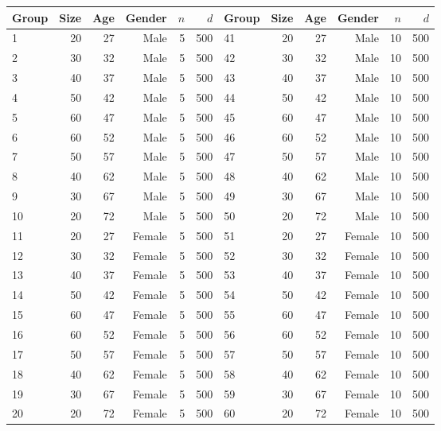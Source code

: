 \begin{table}[!htpb]
\centering
\begingroup\small
\begin{tabular}{lrrrrr|lrrrrr}
  \hline
Group & Size & Age & Gender & $n$ & $d$ & Group & Size & Age & Gender & $n$ & $d$ \\ 
  \hline
1 & 20 & 27 & Male & 5 & 500 & 41 & 20 & 27 & Male & 10 & 500 \\ 
  2 & 30 & 32 & Male & 5 & 500 & 42 & 30 & 32 & Male & 10 & 500 \\ 
  3 & 40 & 37 & Male & 5 & 500 & 43 & 40 & 37 & Male & 10 & 500 \\ 
  4 & 50 & 42 & Male & 5 & 500 & 44 & 50 & 42 & Male & 10 & 500 \\ 
  5 & 60 & 47 & Male & 5 & 500 & 45 & 60 & 47 & Male & 10 & 500 \\ 
  6 & 60 & 52 & Male & 5 & 500 & 46 & 60 & 52 & Male & 10 & 500 \\ 
  7 & 50 & 57 & Male & 5 & 500 & 47 & 50 & 57 & Male & 10 & 500 \\ 
  8 & 40 & 62 & Male & 5 & 500 & 48 & 40 & 62 & Male & 10 & 500 \\ 
  9 & 30 & 67 & Male & 5 & 500 & 49 & 30 & 67 & Male & 10 & 500 \\ 
  10 & 20 & 72 & Male & 5 & 500 & 50 & 20 & 72 & Male & 10 & 500 \\ 
  11 & 20 & 27 & Female & 5 & 500 & 51 & 20 & 27 & Female & 10 & 500 \\ 
  12 & 30 & 32 & Female & 5 & 500 & 52 & 30 & 32 & Female & 10 & 500 \\ 
  13 & 40 & 37 & Female & 5 & 500 & 53 & 40 & 37 & Female & 10 & 500 \\ 
  14 & 50 & 42 & Female & 5 & 500 & 54 & 50 & 42 & Female & 10 & 500 \\ 
  15 & 60 & 47 & Female & 5 & 500 & 55 & 60 & 47 & Female & 10 & 500 \\ 
  16 & 60 & 52 & Female & 5 & 500 & 56 & 60 & 52 & Female & 10 & 500 \\ 
  17 & 50 & 57 & Female & 5 & 500 & 57 & 50 & 57 & Female & 10 & 500 \\ 
  18 & 40 & 62 & Female & 5 & 500 & 58 & 40 & 62 & Female & 10 & 500 \\ 
  19 & 30 & 67 & Female & 5 & 500 & 59 & 30 & 67 & Female & 10 & 500 \\ 
  20 & 20 & 72 & Female & 5 & 500 & 60 & 20 & 72 & Female & 10 & 500 \\ 

\end{tabular}
\end{table}
